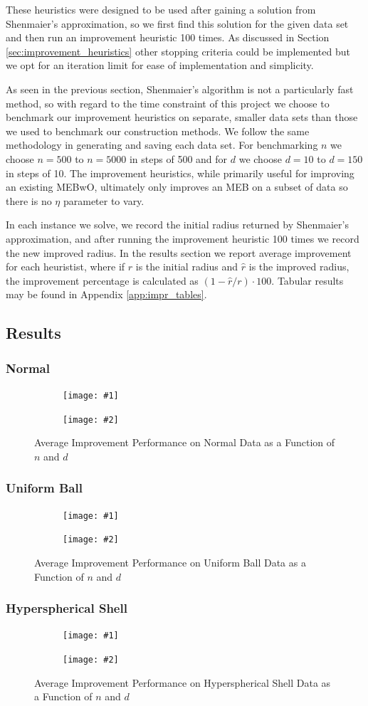 \documentclass[11pt,twoside]{report}
\newcommand{\pairfigure}[4]{
    \begin{figure}[ht]
        \centering
        \begin{subfigure}[b]{0.475\textwidth}
            \centering
            \texttt{[image: \#1]}
        \end{subfigure}
        \hfill
        \begin{subfigure}[b]{0.475\textwidth}
            \centering
            \texttt{[image: \#2]}
        \end{subfigure}
        \caption{#3}
        \label{#4}
\end{figure}
}
\newcommand{\imprfigure}[3]{
    \pairfigure{improvement_r_benchmarks/avg_pct_func_n_d100_eta0p9_#1.png}{improvement_r_benchmarks/avg_pct_func_d_n1000_eta0p9_#1.png}{#2}{#3}
}
\theoremstyle{definition}
\numberwithin{theorem}{section}
\numberwithin{definition}{section}
\numberwithin{lemma}{section}
\numberwithin{proposition}{section}
\numberwithin{equation}{section}
\numberwithin{figure}{section}
\begin{document}
These heuristics were designed to be used after gaining a solution from Shenmaier's approximation, so we first find this solution for the given data set and then run an improvement heuristic 100 times. As discussed in Section \ref{sec:improvement_heuristics} other stopping criteria could be implemented but we opt for an iteration limit for ease of implementation and simplicity.

As seen in the previous section, Shenmaier's algorithm is not a particularly fast method, so with regard to the time constraint of this project we choose to benchmark our improvement heuristics on separate, smaller data sets than those we used to benchmark our construction methods. We follow the same methodology in generating and saving each data set. For benchmarking $n$ we choose $n=500$ to $n=5000$ in steps of 500 and for $d$ we choose $d=10$ to $d=150$ in steps of 10. The improvement heuristics, while primarily useful for improving an existing MEBwO, ultimately only improves an MEB on a subset of data so there is no $\eta$ parameter to vary.

In each instance we solve, we record the initial radius returned by Shenmaier's approximation, and after running the improvement heuristic 100 times we record the new improved radius. In the results section we report average improvement for each heuristist, where if $r$ is the initial radius and $\hat{r}$ is the improved radius, the improvement percentage is calculated as $(1-\hat{r}/r)\cdot100$. Tabular results may be found in Appendix \ref{app:impr_tables}.

\subsection{Results}
\subsubsection{Normal}
\imprfigure{normal}{Average Improvement Performance on Normal Data as a Function of $n$ and $d$}{fig:improvement_normal}



\subsubsection{Uniform Ball}
\imprfigure{uniform_ball}{Average Improvement Performance on Uniform Ball Data as a Function of $n$ and $d$}{fig:improvement_unifball}

\subsubsection{Hyperspherical Shell}
\imprfigure{hyperspherical_shell}{Average Improvement Performance on Hyperspherical Shell Data as a Function of $n$ and $d$}{fig:improvement_hypshell}
\end{document}
